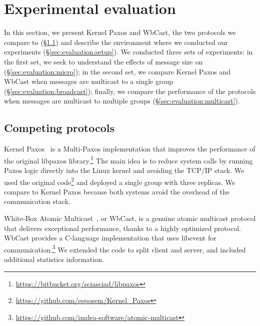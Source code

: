 \section{Experimental evaluation}
\label{sec:experimental-evaluation}

In this section, we present Kernel Paxos and WbCast, the two protocols we compare \libname to (\S\ref{sec:comp}) and
describe the environment where we conducted our experiments (\S\ref{sec:evaluation:setup}).
We conducted three sets of experiments:
in the first set, we seek to understand the effects of message size on \libname (\S\ref{sec:evaluation:micro});
in the second set, we compare Kernel Paxos and WbCast when messages are multicast to a single group (\S\ref{sec:evaluation:broadcast});
finally, we compare the performance of the protocols when messages are multicast to multiple groups (\S\ref{sec:evaluation:multicast}).

\subsection{Competing protocols}
\label{sec:comp}

Kernel Paxos~\cite{esposito2018kernel} is a Multi-Paxos implementation that improves the performance of the original libpaxos library.\footnote{\url{https://bitbucket.org/sciasciad/libpaxos}}
The main idea is to reduce system calls by running Paxos logic directly into the Linux kernel and avoiding the TCP/IP stack. 
We used the original code\footnote{\url{https://github.com/esposem/Kernel_Paxos}} and deployed a single group with three replicas.
We compare \libname to Kernel Paxos because both systems avoid the overhead of the communication stack.

White-Box Atomic Multicast~\cite{gotsman2019white}, or WbCast, is a genuine atomic multicast protocol that delivers exceptional performance, thanks to a highly optimized protocol.
 WbCast provides a C-language implementation that uses libevent for communication.\footnote{\url{https://github.com/imdea-software/atomic-multicast}}
 We extended the code to split client and server, and included additional statistics information.


